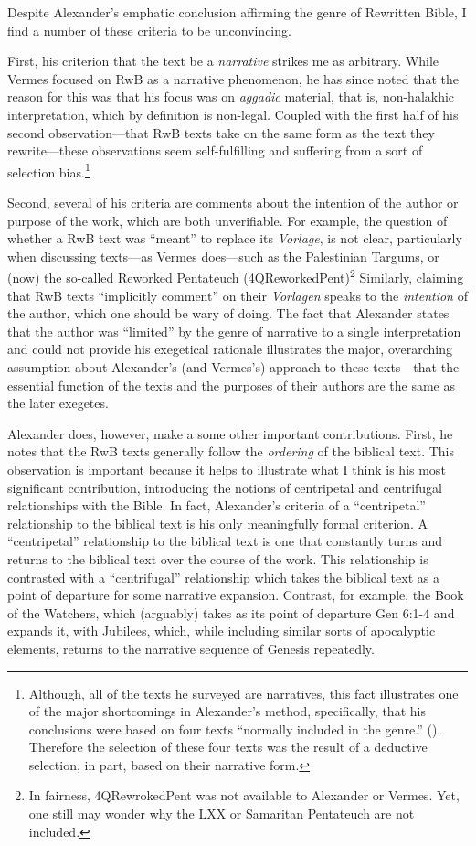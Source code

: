 Despite Alexander's emphatic conclusion affirming the genre of
Rewritten Bible, I find a number of these criteria to be unconvincing.

First, his criterion that the text be a \emph{narrative} strikes me as
arbitrary. While Vermes focused on RwB as a narrative phenomenon, he has
since noted that the reason for this was that his focus was on
\emph{aggadic} material, that is, non-halakhic interpretation, which by
definition is non-legal. Coupled with the first half of his second
observation---that RwB texts take on the same form as the text they
rewrite---these observations seem self-fulfilling and suffering from a
sort of selection bias.\footnote{Although, all of the texts he surveyed
  are narratives, this fact illustrates one of the major shortcomings in
  Alexander's method, specifically, that his conclusions were based on
  four texts ``normally included in the genre.''
  (\textcite[99]{alexander_carson-williamson1988}). Therefore the
  selection of these four texts was the result of a deductive selection,
  in part, based on their narrative form.}

Second, several of his criteria are comments about the intention of the
author or purpose of the work, which are both unverifiable. For example,
the question of whether a RwB text was ``meant'' to replace its
\emph{Vorlage}, is not clear, particularly when discussing texts---as
Vermes does---such as the Palestinian Targums, or (now) the so-called
Reworked Pentateuch (4QReworkedPent)\footnote{In fairness,
  4QRewrokedPent was not available to Alexander or Vermes. Yet, one
  still may wonder why the LXX or Samaritan Pentateuch are not included.}
Similarly, claiming that RwB texts ``implicitly comment'' on their
\emph{Vorlagen} speaks to the \emph{intention} of the author, which one
should be wary of doing. The fact that Alexander states that the author
was ``limited'' by the genre of narrative to a single interpretation and
could not provide his exegetical rationale illustrates the major,
overarching assumption about Alexander's (and Vermes's) approach to
these texts---that the essential function of the texts and the purposes
of their authors are the same as the later exegetes.

Alexander does, however, make a some other important contributions.
First, he notes that the RwB texts generally follow the \emph{ordering}
of the biblical text. This observation is important because it helps to
illustrate what I think is his most significant contribution,
introducing the notions of centripetal and centrifugal relationships
with the Bible. In fact, Alexander's criteria of a ``centripetal''
relationship to the biblical text is his only meaningfully formal
criterion. A ``centripetal'' relationship to the biblical text is one
that constantly turns and returns to the biblical text over the course
of the work. This relationship is contrasted with a ``centrifugal''
relationship which takes the biblical text as a point of departure for
some narrative expansion. Contrast, for example, the Book of the
Watchers, which (arguably) takes as its point of departure Gen 6:1-4 and
expands it, with Jubilees, which, while including similar sorts of
apocalyptic elements, returns to the narrative sequence of Genesis
repeatedly.

